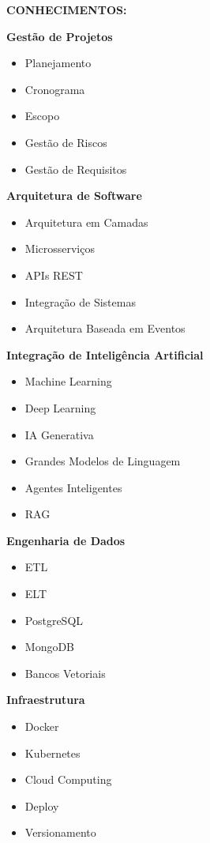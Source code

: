 \textbf{CONHECIMENTOS:}

\textbf{Gestão de Projetos}

\begin{itemize}
\item Planejamento
\item Cronograma
\item Escopo
\item Gestão de Riscos
\item Gestão de Requisitos
\end{itemize}

\textbf{Arquitetura de Software}

\begin{itemize}
\item Arquitetura em Camadas
\item Microsserviços
\item APIs REST
\item Integração de Sistemas
\item Arquitetura Baseada em Eventos
\end{itemize}

\textbf{Integração de Inteligência Artificial}

\begin{itemize}
\item Machine Learning
\item Deep Learning
\item IA Generativa
\item Grandes Modelos de Linguagem
\item Agentes Inteligentes
\item RAG
\end{itemize}

\textbf{Engenharia de Dados}

\begin{itemize}
\item ETL
\item ELT
\item PostgreSQL
\item MongoDB
\item Bancos Vetoriais
\end{itemize}

\textbf{Infraestrutura}

\begin{itemize}
\item Docker
\item Kubernetes
\item Cloud Computing
\item Deploy
\item Versionamento
\end{itemize}

